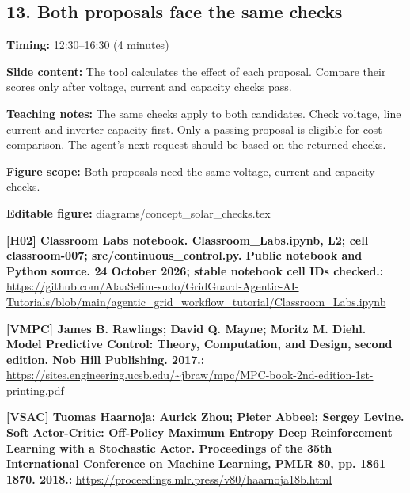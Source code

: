 \documentclass[10pt,letterpaper]{article}
\begin{document}
\subsection*{13. Both proposals face the same checks}
\textbf{Timing:} 12:30--16:30 (4 minutes)\par
\textbf{Slide content:} The tool calculates the effect of each proposal.
Compare their scores only after voltage, current and capacity checks pass.\par
\textbf{Teaching notes:} The same checks apply to both candidates. Check voltage, line current and inverter capacity first. Only a passing proposal is eligible for cost comparison. The agent's next request should be based on the returned checks.\par
\textbf{Figure scope:} Both proposals need the same voltage, current and capacity checks.\par
\textbf{Editable figure:} diagrams/concept\_solar\_checks.tex\par
\textbf{[H02] Classroom Labs notebook. Classroom\_Labs.ipynb, L2; cell classroom-007; src/continuous\_control.py. Public notebook and Python source. 24 October 2026; stable notebook cell IDs checked.:} \href{https://github.com/AlaaSelim-sudo/GridGuard-Agentic-AI-Tutorials/blob/main/agentic_grid_workflow_tutorial/Classroom_Labs.ipynb}{\small\ttfamily https:/\allowbreak{}/\allowbreak{}github.\allowbreak{}com/\allowbreak{}AlaaSelim-\allowbreak{}sudo/\allowbreak{}GridGuard-\allowbreak{}Agentic-\allowbreak{}AI-\allowbreak{}Tutorials/\allowbreak{}blob/\allowbreak{}main/\allowbreak{}agentic\_\allowbreak{}grid\_\allowbreak{}workflow\_\allowbreak{}tutorial/\allowbreak{}Classroom\_\allowbreak{}Labs.\allowbreak{}ipynb}\par
\textbf{[VMPC] James B. Rawlings; David Q. Mayne; Moritz M. Diehl. Model Predictive Control: Theory, Computation, and Design, second edition. Nob Hill Publishing. 2017.:} \href{https://sites.engineering.ucsb.edu/~jbraw/mpc/MPC-book-2nd-edition-1st-printing.pdf}{\small\ttfamily https:/\allowbreak{}/\allowbreak{}sites.\allowbreak{}engineering.\allowbreak{}ucsb.\allowbreak{}edu/\allowbreak{}\textasciitilde{}jbraw/\allowbreak{}mpc/\allowbreak{}MPC-\allowbreak{}book-\allowbreak{}2nd-\allowbreak{}edition-\allowbreak{}1st-\allowbreak{}printing.\allowbreak{}pdf}\par
\textbf{[VSAC] Tuomas Haarnoja; Aurick Zhou; Pieter Abbeel; Sergey Levine. Soft Actor-Critic: Off-Policy Maximum Entropy Deep Reinforcement Learning with a Stochastic Actor. Proceedings of the 35th International Conference on Machine Learning, PMLR 80, pp. 1861--1870. 2018.:} \href{https://proceedings.mlr.press/v80/haarnoja18b.html}{\small\ttfamily https:/\allowbreak{}/\allowbreak{}proceedings.\allowbreak{}mlr.\allowbreak{}press/\allowbreak{}v80/\allowbreak{}haarnoja18b.\allowbreak{}html}\par
\par\medskip
\end{document}

